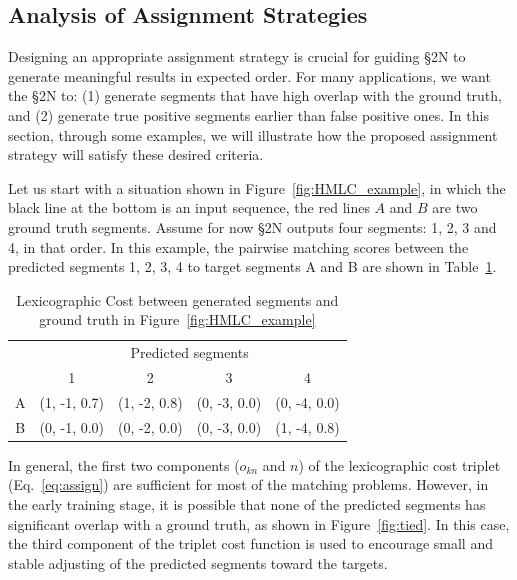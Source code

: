 \documentclass[10pt,journal,compsoc]{IEEEtran}
\begin{document}
\subsection{Analysis\label{sec:analysis} of Assignment Strategies}
Designing an appropriate assignment strategy is crucial for guiding \S2N to generate meaningful results in expected order. For many applications, we want the \S2N to: (1) generate segments that have high overlap with the ground truth, and (2) generate true positive segments earlier than false positive ones. In this section, through some examples, we will illustrate how the proposed assignment strategy will satisfy these desired criteria. 

Let us start with a situation shown in Figure~\ref{fig:HMLC_example}, in which the black line at the bottom is an input sequence, the red lines $A$ and $B$ are two ground truth segments. Assume for now \S2N outputs four segments: 1, 2, 3 and 4, in that order. In this example, the pairwise matching scores between the predicted segments 1, 2, 3, 4 to target segments A and B are shown in Table~\ref{tab:HMLC}. 


\setlength{\tabcolsep}{8pt}
\begin{table}
 \centering
 \begin{tabular}{c  c  c  c c}
 \toprule
& \multicolumn{4}{c}{Predicted segments} \\
\cmidrule{2-5}
   &  1 &  2 & 3 & 4   \\
\midrule 
 A &  (1, -1, 0.7) & (1, -2, 0.8) & (0, -3, 0.0) & (0, -4, 0.0)  \\
 B &  (0, -1, 0.0) & (0, -2, 0.0) & (0, -3, 0.0) & (1, -4, 0.8) \\ 
 \bottomrule
 \end{tabular}
 \caption{Lexicographic Cost between generated segments and ground truth in Figure~\ref{fig:HMLC_example}\label{tab:HMLC}}
 \end{table}


In general, the first two components ($o_{kn}$ and $n$) of the lexicographic cost triplet (Eq.~\ref{eq:assign}) are sufficient for most of the matching problems. However, in the early training stage, it is possible that none of the predicted segments has significant overlap with a ground truth, as shown in Figure~\ref{fig:tied}. In this case, the third component of the triplet cost function is used to encourage small and stable adjusting of the predicted segments toward the targets. 
\end{document}
